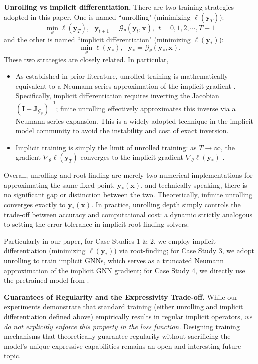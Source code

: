 \documentclass{amsart} %
\def\vx{{\bm{x}}}
\def\vy{{\bm{y}}}
\def\mI{{\bm{I}}}
\def\mJ{{\bm{J}}}
\theoremstyle{definition}
\theoremstyle{remark}
\begin{document}
\textbf{Unrolling vs implicit differentiation.} There are two training strategies adopted in this paper. One is named ``unrolling" (minimizing $\ell(\vy_T)$):
$$\min_\theta \ell(\vy_T), ~~~ \vy_{t+1} = \mathcal{G}_{\theta}(\vy_{t},\vx),~~ t=0,1,2,\cdots,T-1$$ 
and the other is named ``implicit differentiation" (minimizing $\ell(\vy_*)$):
$$\min_\theta \ell(\vy_\ast), ~~~ \vy_{\ast} = \mathcal{G}_{\theta}(\vy_{\ast},\vx).$$
These two strategies are closely related. In particular,
\begin{itemize}[leftmargin=5mm]
    \item As established in prior literature, unrolled training is mathematically equivalent to a Neumann series approximation of the implicit gradient \cite{geng2021training}. Specifically, implicit differentiation requires inverting the Jacobian $(\mI - \mJ_{\mathcal{G}_\theta})^{-1}$; finite unrolling effectively approximates this inverse via a Neumann series expansion. This is a widely adopted technique in the implicit model community to avoid the instability and cost of exact inversion.
    \item Implicit training is simply the limit of unrolled training: as $T \to \infty$, the gradient $\nabla_\theta \ell(\vy_T)$ converges to the implicit gradient $\nabla_\theta \ell(\vy_\ast)$ \cite{geng2021training}.
\end{itemize}
Overall, unrolling and root-finding are merely two numerical implementations for approximating the same fixed point, $\vy_\ast(\vx)$, and technically speaking, there is no significant gap or distinction between the two. Theoretically, infinite unrolling converges exactly to $\vy_\ast(\vx)$. In practice, unrolling depth simply controls the trade-off between accuracy and computational cost: a dynamic strictly analogous to setting the error tolerance in implicit root-finding solvers. 

Particularly in our paper, for Case Studies 1 \& 2, we employ implicit differentiation (minimizing $\ell(\vy_\ast)$) via root-finding; for Case Study 3, we adopt unrolling to train implicit GNNs, which serves as a truncated Neumann approximation of the implicit GNN gradient; for Case Study 4, we directly use the pretrained model from \cite{geiping2025scaling}.

\textbf{Guarantees of Regularity and the Expressivity Trade-off.} While our experiments demonstrate that standard training (either unrolling and implicit differentiation defined above) empirically results in regular implicit operators, \textit{we do not explicitly enforce this property in the loss function.} Designing training mechanisms that theoretically guarantee regularity without sacrificing the model's unique expressive capabilities remains an open and interesting future topic. 
\end{document}
